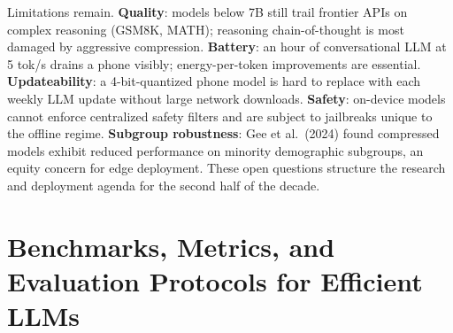 \documentclass{article}
\begin{document}
Limitations remain. \textbf{Quality}: models below 7B still trail frontier APIs on complex reasoning (GSM8K, MATH); reasoning chain-of-thought is most damaged by aggressive compression. \textbf{Battery}: an hour of conversational LLM at 5 tok/s drains a phone visibly; energy-per-token improvements are essential. \textbf{Updateability}: a 4-bit-quantized phone model is hard to replace with each weekly LLM update without large network downloads. \textbf{Safety}: on-device models cannot enforce centralized safety filters and are subject to jailbreaks unique to the offline regime. \textbf{Subgroup robustness}: Gee et al.~(2024) found compressed models exhibit reduced performance on minority demographic subgroups, an equity concern for edge deployment. These open questions structure the research and deployment agenda for the second half of the decade.

\section{Benchmarks, Metrics, and Evaluation Protocols for Efficient LLMs}\label{benchmarks-metrics-and-evaluation-protocols-for-efficient-llms}
\end{document}
